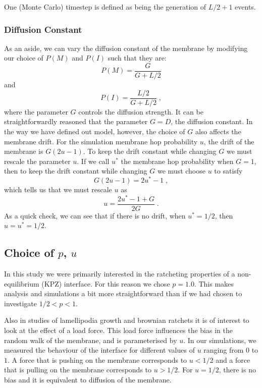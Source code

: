 \documentclass[a4paper,10pt]{article}
\newcommand{\Or}{\mathcal{O}}
\begin{document}
One (Monte Carlo) timestep is defined as being the generation of $L/2+1$ events.

\subsubsection{Diffusion Constant}

As an aside, we can vary the diffusion constant of the membrane by modifying our choice of $P(M)$ and $P(I)$ such that they are:
\begin{equation}
 P(M) = \frac{G}{G + L/2} 
\end{equation}
and
\begin{equation}
 P(I) = \frac{L/2}{G + L/2} \;, 
\end{equation}
where the parameter $G$ controls the diffusion strength. It can be straightforwardly reasoned that the parameter $G = D$, the diffusion constant. In the way we have defined out model, however, the choice of $G$ also affects the membrane drift. For the simulation membrane hop probability $u$, the drift of the membrane is $G(2u-1)$. To keep the drift constant while changing $G$ we must rescale the parameter $u$. If we call $u^*$ the membrane hop probability when $G=1$, then to keep the drift constant while changing $G$ we must choose $u$ to satisfy
\begin{equation}
 G(2u-1) = 2u^*-1 \;,
\end{equation}
which tells us that we must rescale $u$ as
\begin{equation}
  u = \frac{ 2 u^* -1 + G }{2G} \;.
\end{equation}
As a quick check, we can see that if there is no drift, when $u^*=1/2$, then $u=u^*=1/2$.




\subsection{Choice of $p$, $u$}

In this study we were primarily interested in the ratcheting properties of a non-equilibrium (KPZ) interface. For this reason we chose $p=1.0$. This makes analysis and simulations a bit more straightforward than if we had chosen to investigate $1/2<p<1$.

Also in studies of lamellipodia growth and brownian ratchets it is of interest to look at the effect of a load force. This load force influences the bias in the random walk of the membrane, and is parameterised by $u$. In our simulations, we measured the behaviour of the interface for different values of $u$ ranging from $0$ to $1$. A force that is pushing on the membrane corresponds to $u<1/2$ and a force that is pulling on the membrane corresponds to $u>1/2$. For $u=1/2$, there is no bias and it is equivalent to diffusion of the membrane.
\end{document}
